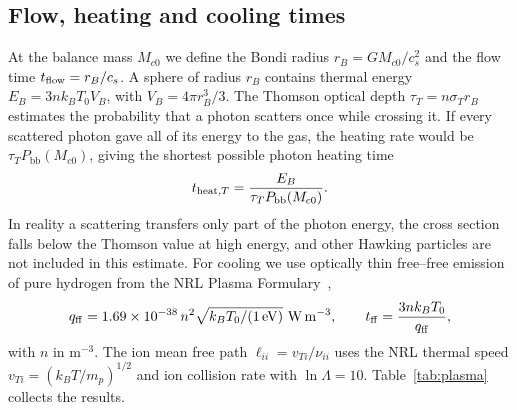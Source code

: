 \documentclass[11pt,a4paper]{article}
\newcommand{\Pbb}{P_{\mathrm{bb}}}
\newcommand{\Mc}{M_{c0}}
\begin{document}
\subsection{Flow, heating and cooling times}
At the balance mass $\Mc$ we define the Bondi radius $r_B=G\Mc/c_s^2$ and the flow time $t_{\rm flow}=r_B/c_s$. A sphere of radius $r_B$ contains thermal energy $E_B=3nk_BT_0V_B$, with $V_B=4\pi r_B^3/3$. The Thomson optical depth $\tau_T=n\sigma_Tr_B$ estimates the probability that a photon scatters once while crossing it. If every scattered photon gave all of its energy to the gas, the heating rate would be $\tau_T\Pbb(\Mc)$, giving the shortest possible photon heating time
\begin{equation*}
 t_{{\rm heat},T}=\frac{E_B}{\tau_T\Pbb(\Mc)}.
\end{equation*}
In reality a scattering transfers only part of the photon energy, the cross section falls below the Thomson value at high energy, and other Hawking particles are not included in this estimate. For cooling we use optically thin free--free emission of pure hydrogen from the NRL Plasma Formulary~\cite{nrl},
\begin{equation*}
 q_{\rm ff}=1.69\times10^{-38}\,n^2\sqrt{k_BT_0/(1\,{\rm eV})}\ \mathrm{W\,m^{-3}},\qquad
 t_{\rm ff}=\frac{3nk_BT_0}{q_{\rm ff}},
\end{equation*}
with $n$ in $\mathrm{m^{-3}}$. The ion mean free path $\ell_{ii}=v_{Ti}/\nu_{ii}$ uses the NRL thermal speed $v_{Ti}=(k_BT/m_p)^{1/2}$ and ion collision rate with $\ln\Lambda=10$. Table~\ref{tab:plasma} collects the results.
\end{document}
